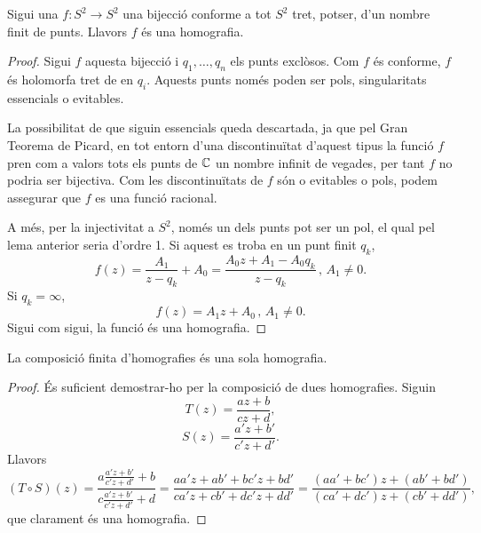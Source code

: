 \documentclass[dvipsnames, svgnames, leqno, a4paper, 12pt]{article}
\begin{document}
        \begin{theorem}
            Sigui una $f\colon S^2\to S^2$ una bijecció conforme a tot $S^2$ tret, potser, d'un nombre finit de punts. Llavors $f$ és una homografia.
        \end{theorem}

        \begin{proof}
            Sigui $f$ aquesta bijecció i $q_1,\dots,q_n$ els punts exclòsos. Com $f$ és conforme, $f$ és holomorfa tret de en $q_i$. Aquests punts només poden ser pols, singularitats essencials o evitables. 
            
            La possibilitat de que siguin essencials queda descartada, ja que pel Gran Teorema de Picard, en tot entorn d'una discontinuïtat d'aquest tipus la funció $f$ pren com a valors tots els punts de $\mathbb{C}$ un nombre infinit de vegades, per tant $f$ no podria ser bijectiva. Com les discontinuïtats de $f$ són o evitables o pols, podem assegurar que $f$ es una funció racional. 
            
            A més, per la injectivitat a $S^2$, només un dels punts pot ser un pol, el qual pel lema anterior seria d'ordre 1. Si aquest es troba en un punt finit $q_k$, \begin{displaymath}
                f(z)=\frac{A_1}{z-q_k}+A_0=\frac{A_0z+A_1-A_0q_k}{z-q_k}\,\text{, } A_1\neq0.
            \end{displaymath}
            Si $q_k=\infty$, 
            \begin{displaymath}
                f(z)=A_1z+A_0\, \text{, } A_1\neq0.
            \end{displaymath}
            Sigui com sigui, la funció és una homografia.
        \end{proof}

        \begin{proposition}\label{prop:comp_homo}
            La composició finita d'homografies és una sola homografia.
        \end{proposition}

        \begin{proof}
            És suficient demostrar-ho per la composició de dues homografies. Siguin 
            \begin{displaymath}
                T(z)=\frac{az+b}{cz+d},
            \end{displaymath}
            \begin{displaymath}
                S(z)=\frac{a'z+b'}{c'z+d'}.
            \end{displaymath}
            Llavors
            \begin{displaymath}
                (T\circ S)(z)=\frac{a\frac{a'z+b'}{c'z+d'}+b}{c\frac{a'z+b'}{c'z+d'}+d}=\frac{aa'z+ab'+bc'z+bd'}{ca'z+cb'+dc'z+dd'}=\frac{\left( aa'+bc' \right)z+(ab'+bd')}{\left( ca'+dc' \right)z+(cb'+dd')},
            \end{displaymath}
            \normalsize
            que clarament és una homografia.
        \end{proof}
\end{document}
